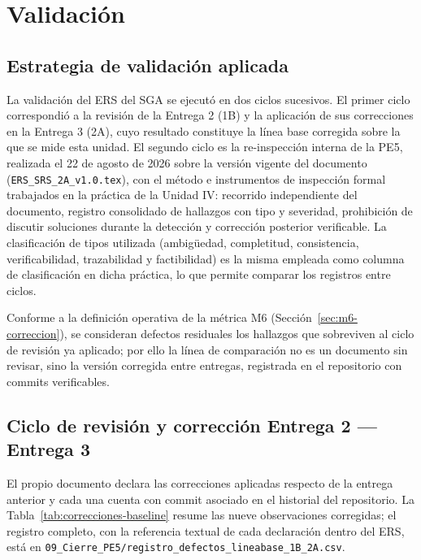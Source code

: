 \section{Validación}
\label{sec:validacion}

\subsection{Estrategia de validación aplicada}
\label{sec:estrategia-validacion}

La validación del ERS del SGA se ejecutó en dos ciclos sucesivos. El primer ciclo correspondió a la revisión de la Entrega 2 (1B) y la aplicación de sus correcciones en la Entrega 3 (2A), cuyo resultado constituye la línea base corregida sobre la que se mide esta unidad. El segundo ciclo es la re-inspección interna de la PE5, realizada el 22 de agosto de 2026 sobre la versión vigente del documento (\texttt{ERS\_SRS\_2A\_v1.0.tex}), con el método e instrumentos de inspección formal trabajados en la práctica de la Unidad IV: recorrido independiente del documento, registro consolidado de hallazgos con tipo y severidad, prohibición de discutir soluciones durante la detección y corrección posterior verificable. La clasificación de tipos utilizada (ambigüedad, completitud, consistencia, verificabilidad, trazabilidad y factibilidad) es la misma empleada como columna de clasificación en dicha práctica, lo que permite comparar los registros entre ciclos.

Conforme a la definición operativa de la métrica M6 (Sección~\ref{sec:m6-correccion}), se consideran defectos residuales los hallazgos que sobreviven al ciclo de revisión ya aplicado; por ello la línea de comparación no es un documento sin revisar, sino la versión corregida entre entregas, registrada en el repositorio con commits verificables.

\subsection{Ciclo de revisión y corrección Entrega 2 --- Entrega 3}
\label{sec:ciclo-correcciones}

El propio documento declara las correcciones aplicadas respecto de la entrega anterior y cada una cuenta con commit asociado en el historial del repositorio. La Tabla~\ref{tab:correcciones-baseline} resume las nueve observaciones corregidas; el registro completo, con la referencia textual de cada declaración dentro del ERS, está en \texttt{09\_Cierre\_PE5/registro\_defectos\_lineabase\_1B\_2A.csv}.

